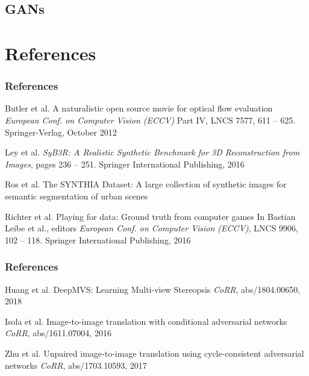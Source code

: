 \documentclass{beamer}
\begin{document}
\subsection{GANs}


\section{References}

\begin{frame}
\frametitle{References}
\footnotesize{
\begin{thebibliography}{99} 
	 Butler et al.
	\newblock A naturalistic open source movie for optical flow evaluation
	\newblock \emph{European Conf. on Computer Vision (ECCV)} Part IV, LNCS 7577, 611 -- 625. Springer-Verlag, October 2012
\end{thebibliography}

\begin{thebibliography}{99} 
	 Ley et al.
	\newblock
	\newblock \emph{SyB3R: A Realistic Synthetic Benchmark for 3D Reconstruction from Images}, pages 236 -- 251. Springer International Publishing, 2016
\end{thebibliography}

\begin{thebibliography}{99} 
	 Ros et al.
	\newblock The SYNTHIA Dataset: A large collection of synthetic images for semantic segmentation of urban scenes
\end{thebibliography}

\begin{thebibliography}{99} 
	 Richter et al.
	\newblock Playing for data: Ground truth from computer games
	\newblock In Bastian Leibe et al., editors \emph{European Conf. on Computer Vision (ECCV)}, LNCS 9906, 102 -- 118. Springer International Publishing, 2016
\end{thebibliography}
}
\end{frame}



\begin{frame}
\frametitle{References}
\footnotesize{
	\begin{thebibliography}{99} 
		 Huang et al.
		\newblock DeepMVS: Learning Multi-view Stereopsis
		\newblock \emph{CoRR}, abs/1804.00650, 2018
	\end{thebibliography}
	\begin{thebibliography}{99} 
		 Isola et al.
		\newblock Image-to-image translation with conditional adversarial networks
		\newblock \emph{CoRR}, abs/1611.07004, 2016
	\end{thebibliography}

	\begin{thebibliography}{99} 
		 Zhu et al.
		\newblock Unpaired image-to-image translation using cycle-consistent adversarial networks
		\newblock \emph{CoRR}, abs/1703.10593, 2017
	\end{thebibliography}
}
\end{frame}

\begin{frame}
\titlepage
\end{frame}

\end{document}
